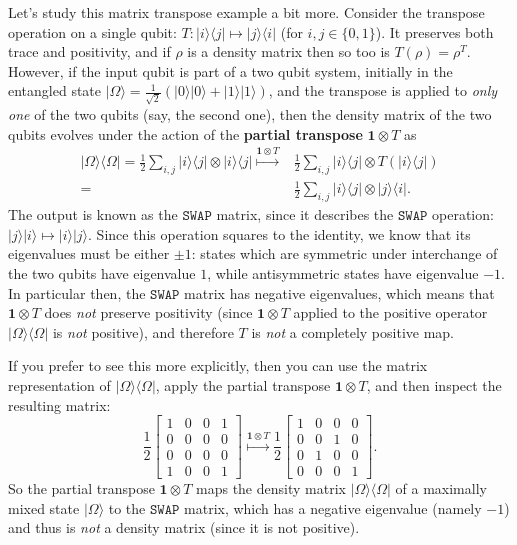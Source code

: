 \documentclass[fleqn]{article}
\begin{document}
Let's study this matrix transpose example a bit more.
Consider the transpose operation on a single qubit: \(T\colon|i\rangle\langle j|\mapsto|j\rangle\langle i|\) (for \(i,j\in\{0,1\}\)).
It preserves both trace and positivity, and if \(\rho\) is a density matrix then so too is \(T(\rho)=\rho^T\).
However, if the input qubit is part of a two qubit system, initially in the entangled state \(|\Omega\rangle=\frac{1}{\sqrt{2}}(|0\rangle|0\rangle+|1\rangle|1\rangle)\), and the transpose is applied to \emph{only one} of the two qubits (say, the second one), then the density matrix of the two qubits evolves under the action of the \textbf{partial transpose} \(\mathbf{1}\otimes T\) as
\[
  \begin{aligned}
    |\Omega\rangle\langle\Omega|
    = \frac{1}{2}\sum_{i,j} |i\rangle\langle j| \otimes |i\rangle\langle j|
    \overset{\mathbf{1}\otimes T}{\longmapsto}
    &\frac{1}{2}\sum_{i,j} |i\rangle\langle j| \otimes T( |i\rangle\langle j|)
  \\= &\frac{1}{2}\sum_{i,j} |i\rangle\langle j| \otimes |j\rangle\langle i|.
  \end{aligned}
\]
The output is known as the \(\texttt{SWAP}\) matrix, since it describes the \(\texttt{SWAP}\) operation: \(|j\rangle|i\rangle\mapsto|i\rangle|j\rangle\).
Since this operation squares to the identity, we know that its eigenvalues must be either \(\pm1\): states which are symmetric under interchange of the two qubits have eigenvalue \(1\), while antisymmetric states have eigenvalue \(-1\).
In particular then, the \(\texttt{SWAP}\) matrix has negative eigenvalues, which means that \(\mathbf{1}\otimes T\) does \emph{not} preserve positivity (since \(\mathbf{1}\otimes T\) applied to the positive operator \(|\Omega\rangle\langle\Omega|\) is \emph{not} positive), and therefore \(T\) is \emph{not} a completely positive map.

If you prefer to see this more explicitly, then you can use the matrix representation of \(|\Omega\rangle\langle\Omega|\), apply the partial transpose \(\mathbf{1}\otimes T\), and then inspect the resulting matrix:
\[
  \frac{1}{2}\left[
  \begin{array}{cc|cc}
    1 & 0 & 0 & 1
  \\0 & 0 & 0 & 0
  \\\hline
    0 & 0 & 0 & 0
  \\1 & 0 & 0 & 1
  \end{array}\right]
  \overset{\mathbf{1}\otimes T}{\longmapsto}
  \frac{1}{2}\left[
  \begin{array}{cc|cc}
    1 & 0 & 0 & 0
  \\0 & 0 & 1 & 0
  \\\hline
    0 & 1 & 0 & 0
  \\0 & 0 & 0 & 1
  \end{array}\right].
\]
So the partial transpose \(\mathbf{1}\otimes T\) maps the density matrix \(|\Omega\rangle\langle\Omega|\) of a maximally mixed state \(|\Omega\rangle\) to the \(\texttt{SWAP}\) matrix, which has a negative eigenvalue (namely \(-1\)) and thus is \emph{not} a density matrix (since it is not positive).
\end{document}
